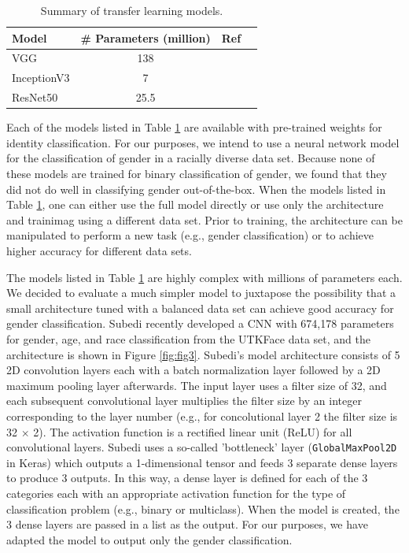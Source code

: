 \documentclass[obeyspaces, spaces, fleqn,10pt]{SelfArx} %
\begin{document}
\begin{table}[hbt]
\caption{Summary of transfer learning models.}
\centering
\begin{tabular}{lclc}
\toprule
Model & \# Parameters (million) & Ref \\
\midrule
VGG & 138 & \cite{Simonyan14c} \\
InceptionV3 & 7 & \cite{inceptionv3} \\
ResNet50 & 25.5 & \cite{resnet} \\
\bottomrule
\end{tabular}
\label{tab:tab2}
\end{table}

\noindent Each of the models listed in Table \ref{tab:tab2} are available with pre-trained weights for identity classification. For our purposes, we intend to use a neural network model for the classification of gender in a racially diverse data set. Because none of these models are trained for binary classification of gender, we found that they did not do well in classifying gender out-of-the-box. When the models listed in Table \ref{tab:tab2}, one can either use the full model directly or use only the architecture and trainimag using a different data set. Prior to training, the architecture can be manipulated to perform a new task (e.g., gender classification) or to achieve higher accuracy for different data sets. 

The models listed in Table \ref{tab:tab2} are highly complex with millions of parameters each. We decided to evaluate a much simpler model to juxtapose the possibility that a small architecture tuned with a balanced data set can achieve good accuracy for gender classification. Subedi recently developed a CNN with 674,178 parameters for gender, age, and race classification from the UTKFace data set, and the architecture is shown in Figure \ref{fig:fig3}.\cite{subedi} Subedi's model architecture consists of 5 2D convolution layers each with a batch normalization layer followed by a 2D maximum pooling layer afterwards. The input layer uses a filter size of 32, and each subsequent convolutional layer multiplies the filter size by an integer corresponding to the layer number (e.g., for concolutional layer 2 the filter size is 32 $\times$ 2). The activation function is a rectified linear unit (ReLU) for all convolutional layers. Subedi uses a so-called 'bottleneck' layer (\texttt{GlobalMaxPool2D} in Keras) which outputs a 1-dimensional tensor and feeds 3 separate dense layers to produce 3 outputs. In this way, a dense layer is defined for each of the 3 categories each with an appropriate activation function for the type of classification problem (e.g., binary or multiclass). When the model is created, the 3 dense layers are passed in a list as the output. For our purposes, we have adapted the model to output only the gender classification.
\end{document}
